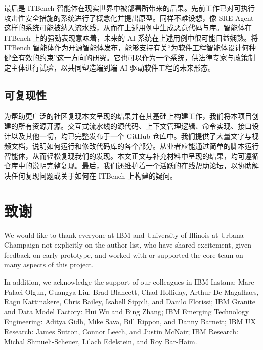 最后是 ITBench 智能体在现实世界中被部署所带来的后果。先前工作已对可执行攻击性安全措施的系统进行了概念化并提出原型。同样不难设想，像 SRE-Agent 这样的系统可能被纳入流水线，从而在上述用例中生成恶意代码与库。智能体在 ITBench 上的强劲表现意味着，未来的 AI 系统在上述用例中很可能日益娴熟。将 ITBench 智能体作为开源智能体发布，能够支持有关“为软件工程智能体设计何种健全有效的约束”这一方向的研究。它也可以作为一个系统，供法律专家与政策制定主体进行试验，以共同塑造端到端 AI 驱动软件工程的未来形态。

\subsection{可复现性}

为帮助更广泛的社区复现本文呈现的结果并在其基础上构建工作，我们将本项目创建的所有资源开源。交互式流水线的源代码、上下文管理逻辑、命令实现、接口设计以及其他一切，均已完整发布于一个 GitHub 仓库中。我们提供了大量文字与视频文档，说明如何运行和修改代码库的各个部分。从业者应能通过简单的脚本运行智能体，从而轻松复现我们的发现。本文正文与补充材料中呈现的结果，均可遵循仓库中的说明完整复现。最后，我们还维护着一个活跃的在线帮助论坛，以协助解决任何复现问题或关于如何在 ITBench 上构建的疑问。

\section*{致谢}

We would like to thank everyone at IBM and University of Illinois at Urbana-Champaign not explicitly on the author list, who have shared excitement, given feedback on early prototype, and worked with or supported the core team on many aspects of this project.

In addition, we acknowledge the support of our colleagues in IBM Instana: Marc Palaci-Olgun, Guangya Liu, Brad Blancett, Chad Holliday, Arthur De Magalhaes, Ragu Kattinakere, Chris Bailey, Isabell Sippili, and Danilo Florissi; IBM Granite and Data Model Factory: Hui Wu and Bing Zhang; IBM Emerging Technology Engineering: Aditya Gidh, Mike Sava, Bill Rippon, and Danny Barnett; IBM UX Research: James Sutton, Connor Leech, and Justin McNair; IBM Research: Michal Shmueli-Scheuer, Lilach Edelstein, and Roy Bar-Haim.
